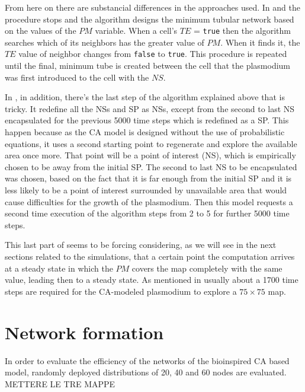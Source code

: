 \par
From here on there are substancial differences in the approaches used. In \cite{dourvas2016gpgpu} and \cite{tsompanas2015cellular} the procedure stops and the algorithm designs the minimum tubular network based on the values of the $PM$ variable. When a cell’s $TE$ = \texttt{true} then the algorithm searches which of its neighbors has the greater value of $PM$. When it finds it, the $TE$ value of neighbor changes from \texttt{false} to \texttt{true}. This procedure is repeated until the final, minimum tube is created between the cell that the plasmodium was first introduced to the cell with the $NS$. 

\par
In \cite{Tsompanas2016}, in addition, there's the last step of the algorithm explained above that is tricky. It redefine all the NSs and SP as NSs, except from the second to last NS encapsulated for the previous 5000 time steps which is redefined as a SP. This happen because as the CA model is designed without the use of probabilistic equations, it uses a second starting point to regenerate and explore the available area once more. That point will be a point of interest (NS), which is empirically chosen to be away from the initial SP. The second to last NS to be encapsulated was chosen, based on the fact that it is far enough from the initial SP and it is less likely to be a point of interest surrounded by unavailable area that would cause difficulties for the growth of the plasmodium. Then this model requests a second time execution of the algorithm steps from 2 to 5 for further 5000 time steps.

\par
This last part of seems to be forcing considering, as we will see in the next sections related to the simulations, that a certain point the computation arrives at a steady state in which the $PM$ covers the map completely with the same value, leading then to a steady state. As mentioned in \cite{dourvas2016gpgpu} usually about a 1700 time steps are required for the CA-modeled plasmodium to explore a $75 \times 75$ map.

\section{Network formation}
In order to evaluate the efficiency of the networks of the bioinspired CA based model, randomly deployed distributions of 20, 40 and 60 nodes are evaluated. 
METTERE LE TRE MAPPE


